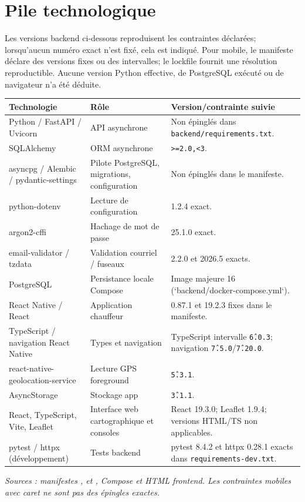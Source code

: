 \documentclass[12pt,a4paper]{article}
\begin{document}
\section{Pile technologique}

Les versions backend ci-dessous reproduisent les contraintes déclarées; lorsqu'aucun numéro exact n'est fixé, cela est indiqué. Pour mobile, le manifeste déclare des versions fixes ou des intervalles; le lockfile fournit une résolution reproductible. Aucune version Python effective, de PostgreSQL exécuté ou de navigateur n'a été déduite.

\small
\begin{longtable}{p{3.4cm}p{5.1cm}p{5.0cm}}
\toprule
Technologie & Rôle & Version/contrainte suivie\\
\midrule
\endhead
Python / FastAPI / Uvicorn & API asynchrone & Non épinglés dans \texttt{backend/requirements.txt}.\\
SQLAlchemy & ORM asynchrone & \texttt{>=2.0,<3}.\\
asyncpg / Alembic / pydantic-settings & Pilote PostgreSQL, migrations, configuration & Non épinglés dans le manifeste.\\
python-dotenv & Lecture de configuration & 1.2.4 exact.\\
argon2-cffi & Hachage de mot de passe & 25.1.0 exact.\\
email-validator / tzdata & Validation courriel / fuseaux & 2.2.0 et 2026.5 exacts.\\
PostgreSQL & Persistance locale Compose & Image majeure 16 (`backend/docker-compose.yml`).\\
React Native / React & Application chauffeur & 0.87.1 et 19.2.3 fixes dans le manifeste.\\
TypeScript / navigation React Native & Types et navigation & TypeScript intervalle \texttt{\^6.0.3}; navigation \texttt{\^7.5.0}/\texttt{\^7.20.0}.\\
react-native-geolocation-service & Lecture GPS foreground & \texttt{\^5.3.1}.\\
AsyncStorage & Stockage app & \texttt{\^3.1.1}.\\
React, TypeScript, Vite, Leaflet & Interface web cartographique et consoles & React 19.3.0; Leaflet 1.9.4; versions HTML/TS non applicables.\\
pytest / httpx (développement) & Tests backend & pytest 8.4.2 et httpx 0.28.1 exacts dans \texttt{requirements-dev.txt}.\\
\bottomrule
\end{longtable}
\normalsize
\textit{Sources : manifestes ,  et , Compose et HTML frontend. Les contraintes mobiles avec caret ne sont pas des épingles exactes.}
\end{document}
